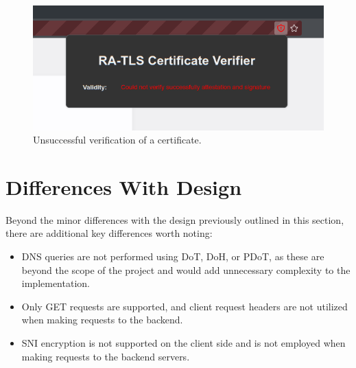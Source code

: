 \begin{figure}[h!]
    \centering
    \includegraphics[width=1\linewidth]{media/not-verified.png}
    \caption{Unsuccessful verification of a certificate.}
    \label{fig:not-verified}
\end{figure}

\clearpage
\section{Differences With Design} \label{sec:differences-with-design}
Beyond the minor differences with the design previously outlined in this section, there are additional key differences worth noting:
\begin{itemize}
    \item DNS queries are not performed using DoT\cite{rfc7858}, DoH\cite{rfc8484}, or PDoT\cite{Nakatsuka_2019}, as these are beyond the scope of the project and would add unnecessary complexity to the implementation.
    \item Only GET requests are supported, and client request headers are not utilized when making requests to the backend.
    \item SNI encryption is not supported on the client side and is not employed when making requests to the backend servers.
\end{itemize}
